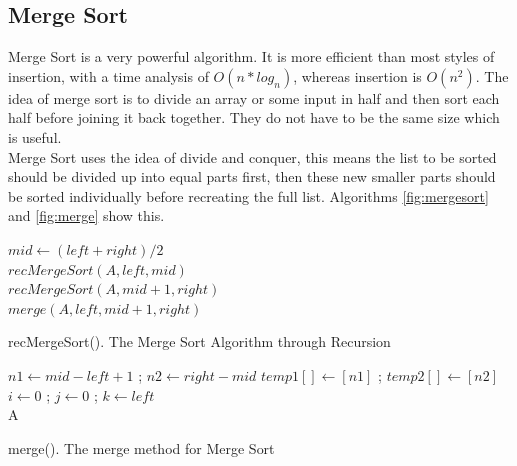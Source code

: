 \documentclass[conference]{IEEEtran}
\begin{document}
\subsection{Merge Sort}
Merge Sort is a very powerful algorithm. It is more efficient than most styles of insertion, with a time analysis of $O(n * log_{n})$, whereas insertion is $O(n^2)$. The idea of merge sort is to divide an array or some input in half and then sort each half before joining it back together. They do not have to be the same size which is useful.  \\
Merge Sort uses the idea of divide and conquer, this means the list to be sorted should be divided up into equal parts first, then these new smaller parts should be sorted individually before recreating the full list. Algorithms \ref{fig:mergesort} and \ref{fig:merge} show this.
\IncMargin{1em}
\begin{algorithm}
	\LinesNumbered
  	{$mid \longleftarrow (left+right)/2$\\
  	$recMergeSort(A,left,mid)$\\
  	$recMergeSort(A,mid+1,right)$\\
  	$merge(A,left,mid+1,right)$
  	}
\caption{recMergeSort(). The Merge Sort Algorithm through Recursion}
\label{fig:mergesort}
\end{algorithm}\DecMargin{1em}

\IncMargin{1em}
\begin{algorithm}
	\LinesNumbered
 	$n1 \longleftarrow mid - left + 1$ ; $n2 \longleftarrow right - mid$\;
 	$temp1[] \longleftarrow [n1]$  ; $temp2[]\longleftarrow [n2]$\;
	$i \longleftarrow 0$ ; $j \longleftarrow 0$ ; $k \longleftarrow left$\\
	\Return A
\caption{merge(). The merge method for Merge Sort}
\label{fig:merge}
\end{algorithm}\DecMargin{1em}
\end{document}
